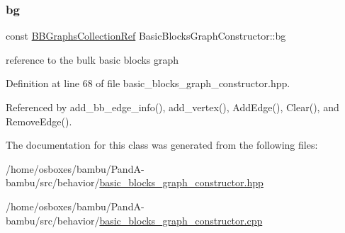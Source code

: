 \subsubsection{\texorpdfstring{bg}{bg}}
{\footnotesize\ttfamily const \hyperlink{basic__block_8hpp_ab2c15dfa325570d7a3e0e364c2f5fdfa}{B\+B\+Graphs\+Collection\+Ref} Basic\+Blocks\+Graph\+Constructor\+::bg\hspace{0.3cm}{\ttfamily [private]}}



reference to the bulk basic blocks graph 



Definition at line 68 of file basic\+\_\+blocks\+\_\+graph\+\_\+constructor.\+hpp.



Referenced by add\+\_\+bb\+\_\+edge\+\_\+info(), add\+\_\+vertex(), Add\+Edge(), Clear(), and Remove\+Edge().



The documentation for this class was generated from the following files\+:\begin{DoxyCompactItemize}
\item 
/home/osboxes/bambu/\+Pand\+A-\/bambu/src/behavior/\hyperlink{basic__blocks__graph__constructor_8hpp}{basic\+\_\+blocks\+\_\+graph\+\_\+constructor.\+hpp}\item 
/home/osboxes/bambu/\+Pand\+A-\/bambu/src/behavior/\hyperlink{basic__blocks__graph__constructor_8cpp}{basic\+\_\+blocks\+\_\+graph\+\_\+constructor.\+cpp}\end{DoxyCompactItemize}
